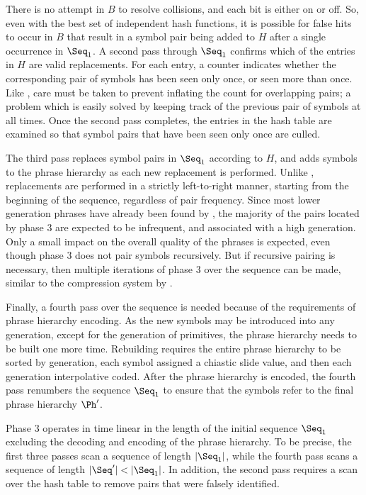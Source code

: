 There is no attempt in $B$ to resolve collisions, and each bit is
either on or off.  So, even with the best set of independent hash 
functions, it is possible for false hits to occur in $B$ that 
result in a symbol pair being added to $H$ after a single occurrence
in $\Seq_1$.  A second pass through $\Seq_1$
confirms which of the entries in $H$ are valid 
replacements.  For each entry, a counter indicates
whether the corresponding pair of symbols has 
been seen only once, or seen more than once.  Like \repair,
care must be taken to prevent inflating the count for 
overlapping pairs; a problem which is easily solved by keeping
track of the previous pair of symbols at all times.  
Once the second pass completes, the entries in the hash table 
are examined so that symbol pairs that 
have been seen only once are culled.

The third pass replaces symbol pairs in $\Seq_1$ according to
$H$, and adds symbols to the phrase hierarchy as each new 
replacement is performed.  Unlike \repair, 
replacements are performed in a strictly left-to-right 
manner, starting from the beginning of the sequence, 
regardless of pair frequency.  Since most lower generation phrases
have already been found by \repair, the majority of the pairs located
by phase 3 are expected to be infrequent, and associated
with a high generation.
Only a small impact on the overall quality of the phrases
is expected, even though phase 3 does not pair symbols recursively.
But if recursive
pairing is necessary, then multiple iterations of phase 3
over the sequence can be made, similar to the compression 
system \ray by \citet{cw01:jasist}.

Finally, a fourth pass over the sequence is needed 
because of the requirements of phrase hierarchy encoding.
As the new symbols may be introduced into any 
generation, except for the generation of primitives, the
phrase hierarchy needs to be built one more time.
Rebuilding requires the entire
phrase hierarchy to be sorted by generation, each symbol
assigned a chiastic slide value, and then each generation
interpolative coded.  After the phrase hierarchy is encoded,
the fourth pass renumbers the sequence $\Seq_1$ to ensure that the
symbols refer to the final phrase hierarchy $\Ph'$.

Phase 3 operates in time linear in the length of the initial
sequence $\Seq_1$ excluding the decoding and encoding of
the phrase hierarchy.  To be precise, the first three passes 
scan a sequence of length $|\Seq_1|$, while the fourth pass 
scans a sequence of length $|\Seq'| < |\Seq_1|$.  In addition, 
the second pass requires a scan over the hash table to remove
pairs that were falsely identified.

